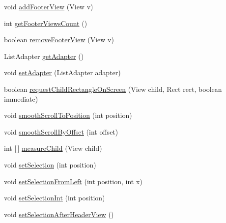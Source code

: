 \begin{DoxyCompactItemize}
void \hyperlink{classit_1_1sephiroth_1_1android_1_1library_1_1widget_1_1_h_list_view_a097d56c4a6e622994d968adda5c41b3b}{add\+Footer\+View} (View v)
\item 
int \hyperlink{classit_1_1sephiroth_1_1android_1_1library_1_1widget_1_1_h_list_view_a8226c14590654c338b939eee185e9e6f}{get\+Footer\+Views\+Count} ()
\item 
boolean \hyperlink{classit_1_1sephiroth_1_1android_1_1library_1_1widget_1_1_h_list_view_a77cf6b425039834d85ac64e2b4d4e1a6}{remove\+Footer\+View} (View v)
\item 
List\+Adapter \hyperlink{classit_1_1sephiroth_1_1android_1_1library_1_1widget_1_1_h_list_view_a70eebe0913d5f7b099e0cf880777b25d}{get\+Adapter} ()
\item 
void \hyperlink{classit_1_1sephiroth_1_1android_1_1library_1_1widget_1_1_h_list_view_aae735173f3594a4e6389a9f2a54d9103}{set\+Adapter} (List\+Adapter adapter)
\item 
boolean \hyperlink{classit_1_1sephiroth_1_1android_1_1library_1_1widget_1_1_h_list_view_ab24a7eed55ccf0d0ba96dfe1472513da}{request\+Child\+Rectangle\+On\+Screen} (View child, Rect rect, boolean immediate)
\item 
void \hyperlink{classit_1_1sephiroth_1_1android_1_1library_1_1widget_1_1_h_list_view_a9d74e64ad30f32a2e43dd0ea2a0d6bc1}{smooth\+Scroll\+To\+Position} (int position)
\item 
void \hyperlink{classit_1_1sephiroth_1_1android_1_1library_1_1widget_1_1_h_list_view_acb184050269126e4d237b6b7ef1c8460}{smooth\+Scroll\+By\+Offset} (int offset)
\item 
int \mbox{[}$\,$\mbox{]} \hyperlink{classit_1_1sephiroth_1_1android_1_1library_1_1widget_1_1_h_list_view_ae68e5ab99f26bef107f692a0c4660e20}{measure\+Child} (View child)
\item 
void \hyperlink{classit_1_1sephiroth_1_1android_1_1library_1_1widget_1_1_h_list_view_a25c39c0ebc52b9e19b30328fb3c7a217}{set\+Selection} (int position)
\item 
void \hyperlink{classit_1_1sephiroth_1_1android_1_1library_1_1widget_1_1_h_list_view_a7e1831e41e63d13b8c1a5bde74f32fa9}{set\+Selection\+From\+Left} (int position, int x)
\item 
void \hyperlink{classit_1_1sephiroth_1_1android_1_1library_1_1widget_1_1_h_list_view_a0bce88ad74e3e76a681f52a4bc80d7ea}{set\+Selection\+Int} (int position)
\item 
void \hyperlink{classit_1_1sephiroth_1_1android_1_1library_1_1widget_1_1_h_list_view_aaa1a3ef829fb6003b0891e082513a46c}{set\+Selection\+After\+Header\+View} ()

\end{DoxyCompactItemize}
